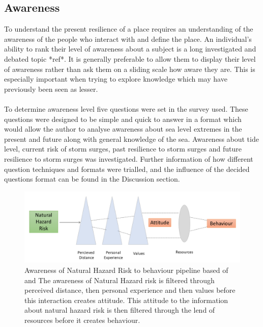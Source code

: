 \subsection{Awareness}
To understand the present resilience of a place requires an understanding of the awareness of the people who interact with and define the place. An individual’s ability to rank their level of awareness about a subject is a long investigated and debated topic *ref*. It is generally preferable to allow them to display their level of awareness rather than ask them on a sliding scale how aware they are. This is especially important when trying to explore knowledge which may have previously been seen as lesser.

\paragraph{}
To determine awareness level five questions were set in the survey used. These questions were designed to be simple and quick to answer in a format which would allow the author to analyse awareness about sea level extremes in the present and future along with general knowledge of the sea. Awareness about tide level, current risk of storm surges, past resilience to storm surges and future resilience to storm surges was investigated. Further information of how different question techniques and formats were trialled, and the influence of the decided questions format can be found in the Discussion section.

\begin{figure}[h]
    \centering
    \includegraphics[width=1\textwidth]{fig_theory/awareness lujala and whitmarsh.png}
     \caption{Awareness of Natural Hazard Risk to behaviour pipeline based of \cite{lujala_climate_2015} and \cite{whitmarsh_are_2008} The awareness of Natural Hazard risk is filtered through perceived distance, then personal experience and then values before this interaction creates attitude. This attitude to the information about natural hazard risk is then filtered through the lend of resources before it creates behaviour.}
    \label{fig:my_awareness}
\end{figure}

